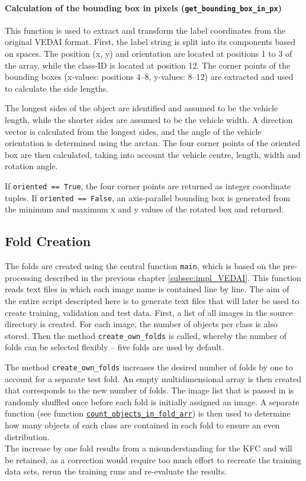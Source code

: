 \paragraph{Calculation of the bounding box in pixels (\lstinline|get_bounding_box_in_px|)}

This function is used to extract and transform the label coordinates from the original \acrshort{VEDAI} format. First, the label string is split into its components based on spaces. The position (x, y) and orientation are located at positions 1 to 3 of the array, while the class-\acrshort{ID} is located at position 12. The corner points of the bounding boxes (x-values: positions 4–8, y-values: 8–12) are extracted and used to calculate the side lengths.

The longest sides of the object are identified and assumed to be the vehicle length, while the shorter sides are assumed to be the vehicle width. A direction vector is calculated from the longest sides, and the angle of the vehicle orientation is determined using the arctan. The four corner points of the oriented box are then calculated, taking into account the vehicle centre, length, width and rotation angle.

If \lstinline|oriented == True|, the four corner points are returned as integer coordinate tuples. If \lstinline|oriented == False|, an axis-parallel bounding box is generated from the minimum and maximum x and y values of the rotated box and returned.


\subsection{Fold Creation}
\label{subsec:Fold_creation}


The folds are created using the central function \lstinline|main|, which is based on the pre-processing described in the previous chapter \ref{subsec:impl_VEDAI}. This function reads text files in which each image name is contained line by line. The aim of the entire script descripted here is to generate text files that will later be used to create training, validation and test data. First, a list of all images in the source directory is created. For each image, the number of objects per class is also stored. Then the method \lstinline|create_own_folds| is called, whereby the number of folds can be selected flexibly – five folds are used by default.

The method \lstinline|create_own_folds| increases the desired number of folds by one to account for a separate test fold. An empty multidimensional array is then created that corresponds to the new number of folds. The image list that is passed in is randomly shuffled once before each fold is initially assigned an image. A separate function (see function \hyperlink{par:count_objects_in_fold_arr}{\lstinline|count_objects_in_fold_arr|}) is then used to determine how many objects of each class are contained in each fold to ensure an even distribution.\\
The increase by one fold results from a misunderstanding for the \acrshort{KFC} and will be retained, as a correction would require too much effort to recreate the training data sets, rerun the training runs and re-evaluate the results.

